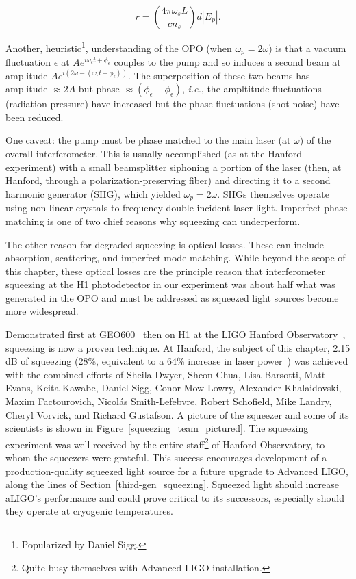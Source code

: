 \begin{equation}
r = \left(\frac{4\pi \omega_s L}{c n_s} \right) d |E_p|.
\label{how_much_squeezing}
\end{equation} 

\noindent Another, heuristic\footnote{Popularized by Daniel Sigg.}, understanding of the OPO (when $\omega_p = 2\omega)$ is that a vacuum fluctuation $\epsilon$ at $A e^{i\omega_\epsilon t + \phi_\epsilon}$ couples to the pump and so induces a second beam at amplitude $A e^{i\left(2\omega - (\omega_\epsilon t + \phi_\epsilon)\right)}$.
The superposition of these two beams has amplitude $\approx 2 A$ but phase $\approx (\phi_\epsilon - \phi_\epsilon)$, \textit{i.e.}, the ampltitude fluctuations (radiation pressure) have increased but the phase fluctuations (shot noise) have been reduced.

One caveat: the pump must be phase matched to the main laser (at $\omega$) of the overall interferometer.
This is usually accomplished (as at the Hanford experiment) with a small beamsplitter siphoning a portion of the laser (then, at Hanford, through a polarization-preserving fiber) and directing it to a second harmonic generator (SHG), which yielded $\omega_p = 2\omega$.
SHGs themselves operate using non-linear crystals to frequency-double incident laser light.
Imperfect phase matching is one of two chief reasons why squeezing can underperform.

The other reason for degraded squeezing is optical losses.
These can include absorption, scattering, and imperfect mode-matching.
While beyond the scope of this chapter, these optical losses are the principle reason that interferometer squeezing at the H1 photodetector in our experiment was about half what was generated in the OPO and must be addressed as squeezed light sources become more widespread.

Demonstrated first at GEO600~\cite{GEO600NatureSqueezing} then on H1 at the LIGO Hanford Observatory~\cite{BarsottiNatureSqueezing}, squeezing is now a proven technique.
At Hanford, the subject of this chapter, 2.15 dB of squeezing (28\%, equivalent to a 64\% increase in laser power~\cite{BarsottiNatureSqueezing}) was achieved with the combined efforts of Sheila Dwyer, Sheon Chua, Lisa Barsotti, Matt Evans, Keita Kawabe, Daniel Sigg, Conor Mow-Lowry, Alexander Khalaidovski, Maxim Factourovich, Nicol\'{a}s Smith-Lefebvre, Robert Schofield, Mike Landry, Cheryl Vorvick, and Richard Gustafson.
A picture of the squeezer and some of its scientists is shown in Figure~\ref{squeezing_team_pictured}.
The squeezing experiment was well-received by the entire staff\footnote{Quite busy themselves with Advanced LIGO installation.} of Hanford Observatory, to whom the squeezers were grateful.
This success encourages development of a production-quality squeezed light source for a future upgrade to Advanced LIGO, along the lines of Section~\ref{third-gen_squeezing}.
Squeezed light should increase aLIGO's performance and could prove critical to its successors, especially should they operate at cryogenic temperatures.

